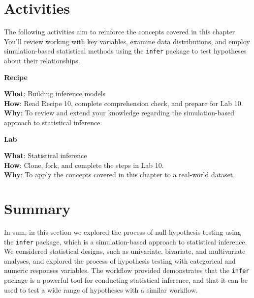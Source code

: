 \documentclass[
  letterpaper,
]{latex/krantz}
\theoremstyle{definition}
\theoremstyle{remark}
\begin{document}
\section*{Activities}\label{activities-8}


The following activities aim to reinforce the concepts covered in this
chapter. You'll review working with key variables, examine data
distributions, and employ simulation-based statistical methods using the
\texttt{infer} package to test hypotheses about their relationships.

\begin{tcolorbox}[enhanced jigsaw, breakable, leftrule=.75mm, arc=.35mm, colframe=quarto-callout-color-frame, colback=white, left=2mm, bottomrule=.15mm, rightrule=.15mm, toprule=.15mm, opacityback=0]

\textbf{ Recipe}

\textbf{What}: Building inference models\\
\textbf{How}: Read Recipe 10, complete comprehension check, and prepare
for Lab 10.\\
\textbf{Why}: To review and extend your knowledge regarding the
simulation-based approach to statistical inference.

\end{tcolorbox}

\begin{tcolorbox}[enhanced jigsaw, breakable, leftrule=.75mm, arc=.35mm, colframe=quarto-callout-color-frame, colback=white, left=2mm, bottomrule=.15mm, rightrule=.15mm, toprule=.15mm, opacityback=0]

\textbf{ Lab}

\textbf{What}: Statistical inference\\
\textbf{How}: Clone, fork, and complete the steps in Lab 10.\\
\textbf{Why}: To apply the concepts covered in this chapter to a
real-world dataset.

\end{tcolorbox}

\section*{Summary}\label{summary-9}


In sum, in this section we explored the process of null hypothesis
testing using the \texttt{infer} package, which is a simulation-based
approach to statistical inference. We considered statistical designs,
such as univariate, bivariate, and multivariate analyses, and explored
the process of hypothesis testing with categorical and numeric responses
variables. The workflow provided demonstrates that the \texttt{infer}
package is a powerful tool for conducting statistical inference, and
that it can be used to test a wide range of hypotheses with a similar
workflow.
\end{document}
